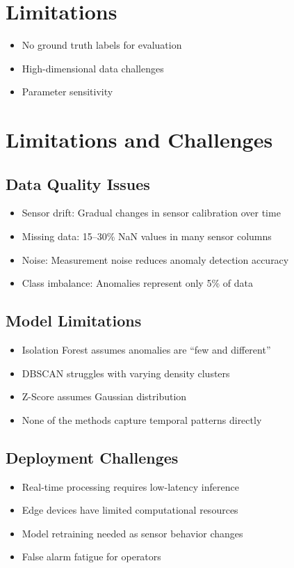 \documentclass[12pt,a4paper]{report}
\begin{document}
\section{Limitations}
\begin{itemize}
    \item No ground truth labels for evaluation
    \item High-dimensional data challenges
    \item Parameter sensitivity
\end{itemize}

\section{Limitations and Challenges}

\subsection{Data Quality Issues}
\begin{itemize}
    \item Sensor drift: Gradual changes in sensor calibration over time
    \item Missing data: 15--30\% NaN values in many sensor columns
    \item Noise: Measurement noise reduces anomaly detection accuracy
    \item Class imbalance: Anomalies represent only 5\% of data
\end{itemize}

\subsection{Model Limitations}
\begin{itemize}
    \item Isolation Forest assumes anomalies are ``few and different''
    \item DBSCAN struggles with varying density clusters
    \item Z-Score assumes Gaussian distribution
    \item None of the methods capture temporal patterns directly
\end{itemize}

\subsection{Deployment Challenges}
\begin{itemize}
    \item Real-time processing requires low-latency inference
    \item Edge devices have limited computational resources
    \item Model retraining needed as sensor behavior changes
    \item False alarm fatigue for operators
\end{itemize}
\end{document}

